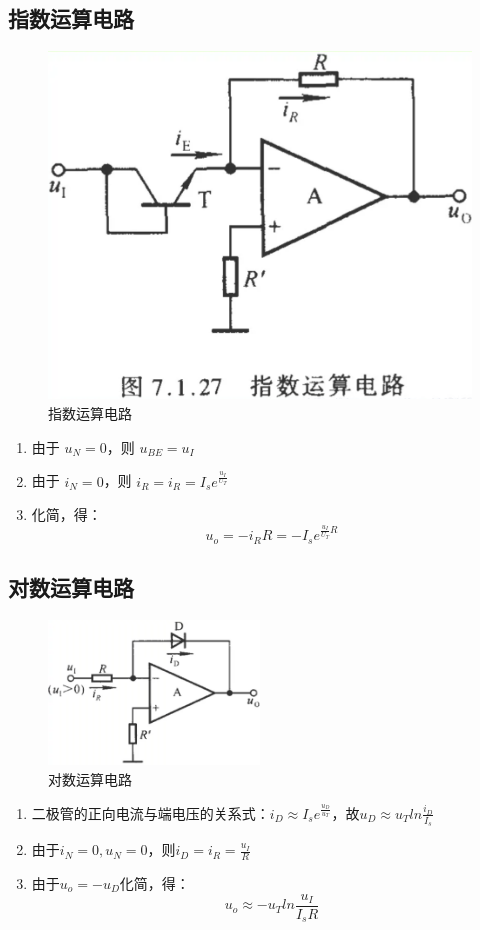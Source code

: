 \documentclass[a4paper,11pt,UTF8]{article}
\begin{document}
\subsection{指数运算电路}
\begin{figure}
	\centering
	\includegraphics[width=0.5\linewidth]{指数运算电路}
	\caption{指数运算电路}
\end{figure}
\begin{enumerate}
	\item 由于 $u_{N}=0$，则 $u_{BE}=u_{I}$
	\item 由于 $i_{N}=0$，则 $i_{R}=i_{R}=I_{s}e^{ \frac{u_{I}}{U_{T}} }$
	\item 化简，得：
	      $$
		      u_{o}=-i_{R}R=-I_{s}e^{ \frac{u_{I}}{U_{T}}R }
	      $$
\end{enumerate}


\subsection{对数运算电路}
\begin{figure}[H]
	\centering
	\includegraphics[width=0.5\textwidth]{对数运算电路}
	\caption{对数运算电路}
\end{figure}
\begin{enumerate}
	\item 二极管的正向电流与端电压的关系式：$i_D \approx I_s e^{\frac{u_D}{u_T}}$，故$u_D \approx u_T ln\frac{i_D}{I_s}$
	\item 由于$i_N=0,u_N=0$，则$i_D=i_R=\frac{u_I}{R}$
	\item  由于$u_o=-u_D$化简，得：
	      $$u_o \approx -u_Tln\frac{u_I}{I_sR}$$
\end{enumerate}
\end{document}

